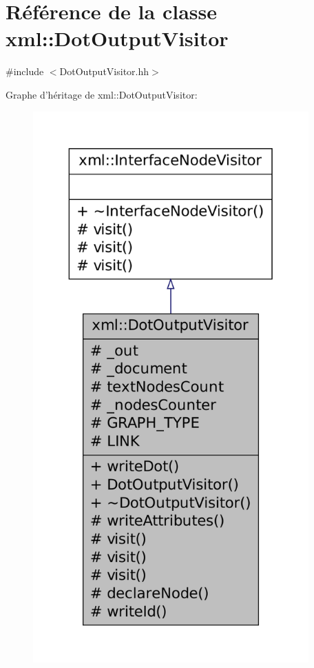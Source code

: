 \hypertarget{classxml_1_1_dot_output_visitor}{
\section{Référence de la classe xml::DotOutputVisitor}
\label{classxml_1_1_dot_output_visitor}
}


{\ttfamily \#include $<$DotOutputVisitor.hh$>$}



Graphe d'héritage de xml::DotOutputVisitor:
\nopagebreak
\begin{figure}[H]
\begin{center}
\leavevmode
\includegraphics[height=600pt]{classxml_1_1_dot_output_visitor__inherit__graph}
\end{center}
\end{figure}



